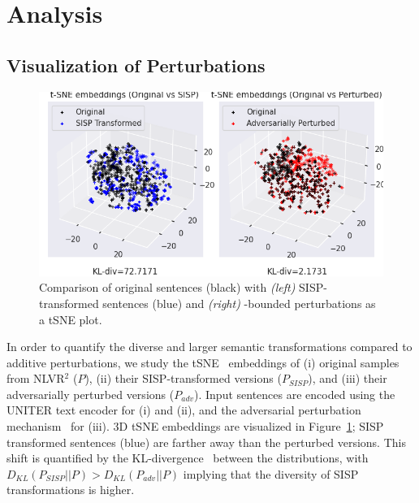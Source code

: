 \section{Analysis}
\label{sec:05_analysis}

\subsection{Visualization of Perturbations}
\begin{figure}
    \centering
    \includegraphics[width=\linewidth]{sdro/images/tsne_orig_both_pplx_5.png}
    \caption{
    Comparison of original sentences (black) with \textit{(left)} SISP-transformed sentences (blue) and \textit{(right)} \straightepsilon-bounded perturbations
    as a tSNE plot.
    }
    \label{fig:tsne}
\end{figure}
In order to quantify the diverse and larger semantic transformations compared to additive perturbations, 
we study the tSNE~\citep{van2008visualizing} embeddings of (i) original samples from NLVR$^2$ ($P$), (ii) their SISP-transformed versions ($P_{SISP}$), and (iii) their adversarially perturbed versions ($P_{adv}$).
Input sentences are encoded using the UNITER text encoder for (i) and (ii), and the adversarial perturbation mechanism~\citep{gan2020large} for (iii).
3D tSNE embeddings are visualized in Figure~\ref{fig:tsne}; SISP transformed sentences (blue) are farther away than the perturbed versions.
This shift is quantified by the KL-divergence~\citep{kullback1951information} between the distributions, with $D_{KL}(P_{SISP}||P) > D_{KL}(P_{adv}||P)$ implying that the diversity of SISP transformations is higher.


